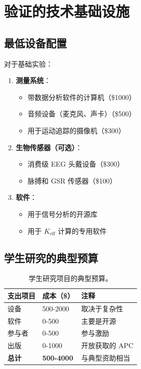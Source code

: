 \documentclass[12pt,a4paper]{article}
\begin{document}
	\section{验证的技术基础设施}
	
	\subsection{最低设备配置}
	
	对于基础实验：
	\begin{enumerate}
		\item \textbf{测量系统}：
		\begin{itemize}
			\item 带数据分析软件的计算机（\$1000）
			\item 音频设备（麦克风、声卡）（\$500）
			\item 用于运动追踪的摄像机（\$300）
		\end{itemize}
		
		\item \textbf{生物传感器（可选）}：
		\begin{itemize}
			\item 消费级 EEG 头戴设备（\$300）
			\item 脉搏和 GSR 传感器（\$100）
		\end{itemize}
		
		\item \textbf{软件}：
		\begin{itemize}
			\item 用于信号分析的开源库
			\item 用于 $K_{\mathrm{eff}}$ 计算的专用软件
		\end{itemize}
	\end{enumerate}
	
	\subsection{学生研究的典型预算}
	
	\begin{table}[h]
		\centering
		\begin{tabular}{p{}p{}p{}}
			\toprule
			\textbf{支出项目} & \textbf{成本（\$）} & \textbf{注释} \\
			\midrule
			设备 & 500-2000 & 取决于复杂性 \\
			软件 & 0-500 & 主要是开源 \\
			参与者 & 0-500 & 参与激励 \\
			出版 & 0-1000 & 开放获取的 APC \\
			\midrule
			\textbf{总计} & \textbf{500-4000} & 与典型资助相当 \\
			\bottomrule
		\end{tabular}
		\caption{学生研究项目的典型预算。}
		\label{tab:student-budget}
	\end{table}
	
\end{document}
